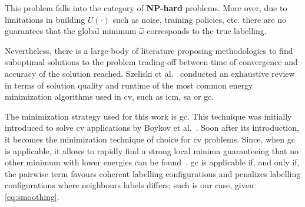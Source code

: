 This problem falls into the category of \textbf{NP-hard} problems. 
More over, due to limitations in building $U(\cdot)$ such as noise, training policies, etc. there are no guarantees that the global minimum $\hat{\omega}$ corresponds to the true labelling.

Nevertheless, there is a large body of literature proposing methodologies to find suboptimal solutions to the problem trading-off between time of convergence and accuracy of the solution reached.
Szeliski et al.~\cite{szeliski2008comparative} conducted an exhaustive review in terms of solution quality and runtime of the most common energy minimization algorithms used in \ac{cv}, such as \ac{icm}, \ac{sa} or \ac{gc}.

The minimization strategy used for this work is \ac{gc}. 
This technique was initially introduced to solve \ac{cv} applications by Boykov et al.~\cite{boykov2001fast}.
Soon after its introduction, it becomes the minimization technique of choice for \ac{cv} problems.
Since, when \ac{gc} is applicable, it allows to rapidly find a strong local minima guaranteeing that no other minimum with lower energies can be found~\cite{delong2012fast}. 
\ac{gc} is applicable if, and only if, the pairwise term favours coherent labelling configurations and penalizes labelling configurations where neighbours labels differs; 
such is our case, given \cref{eq:smoothing}.


